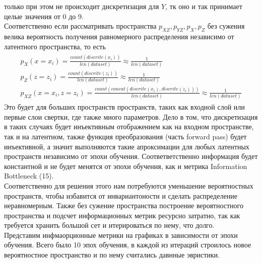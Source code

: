 только при этом не происходит дискретизация для $Y$, тк оно и так принимает целые значения от 0 до 9. \\
Соответственно если рассматривать пространства $p_{XZ}, p_{YZ}, p_{X}, p_{Z}$ без сужения велика вероятность получения равномерного распределения независимо от латентного пространства, то есть 
\begin{gather}
\begin{aligned}
p_X(x=x_i) = \frac{count(discrite(x_i))}{len(dataset)} \approx \frac{1}{len(dataset)} \\
p_Z(z=z_i) = \frac{count(discrite(z_i))}{len(dataset)} \approx \frac{1}{len(dataset)} \\
p_{XZ}(x=x_i, z=z_i) = \frac{count(concat(discrite(x_i), discrite(z_i)))}{len(dataset) } \approx \frac{1}{len(dataset)} 
\end{aligned}
\end{gather}
Это будет для больших пространств пространств, таких как входной слой или первые слои свертки, где также много параметров. Дело в том, что дискретизация в таких случаях будет инъективным отображением как на входном пространстве, так и на латентном, также функция преобразования (часть forward pass) будет инъективной, а значит выполняются такие апроксимации для любых латентных пространств независимо от эпохи обучения. Соответветственно информация будет константной и не будет менятся от эпохи обучения, как и метрика Information Bottleneck (15). \\
Соответственно для решения этого нам потребуются уменьшение вероятностных пространств, чтобы избавится от инвариантоности и сделать распределение неравномерным. Также без сужение пространства построение вероятностного пространства и подсчет информационных метрик ресурсно затратно, так как требуется хранить большой сет и итерироваться по нему, что долго. \\
Представим инфмаорционные метрики на графиках в зависимости от эпохи обучения. Всего было 10 эпох обучения, в каждой из итераций строилось новое вероятностное пространство и по нему считались давнные эвристики.
